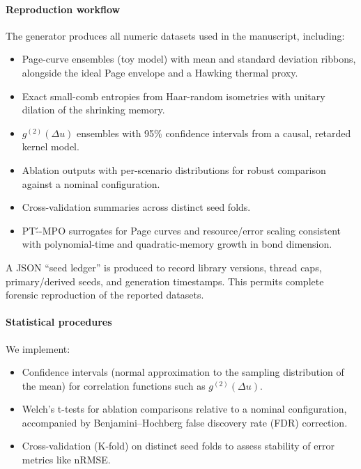 \documentclass[a4paper,11pt]{article}
\theoremstyle{plain}
\theoremstyle{definition}
\theoremstyle{remark}
\begin{document}
\paragraph{Reproduction workflow}
The generator produces all numeric datasets used in the manuscript, including:
\begin{itemize}
  \item Page-curve ensembles (toy model) with mean and standard deviation ribbons, alongside the ideal Page envelope and a Hawking thermal proxy.
  \item Exact small-comb entropies from Haar-random isometries with unitary dilation of the shrinking memory.
  \item $g^{(2)}(\Delta u)$ ensembles with 95\% confidence intervals from a causal, retarded kernel model.
  \item Ablation outputs with per-scenario distributions for robust comparison against a nominal configuration.
  \item Cross-validation summaries across distinct seed folds.
  \item PT\'--MPO surrogates for Page curves and resource/error scaling consistent with polynomial-time and quadratic-memory growth in bond dimension.
\end{itemize}
A JSON ``seed ledger'' is produced to record library versions, thread caps, primary/derived seeds, and generation timestamps. This permits complete forensic reproduction of the reported datasets.

\paragraph{Statistical procedures}
We implement:
\begin{itemize}
  \item Confidence intervals (normal approximation to the sampling distribution of the mean) for correlation functions such as $g^{(2)}(\Delta u)$.
  \item Welch's t-tests for ablation comparisons relative to a nominal configuration, accompanied by Benjamini--Hochberg false discovery rate (FDR) correction.
  \item Cross-validation (K-fold) on distinct seed folds to assess stability of error metrics like nRMSE.
\end{itemize}
\end{document}
